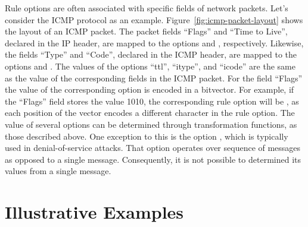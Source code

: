 \documentclass[sigconf,review, anonymous]{acmart}
\begin{document}
Rule options are often associated with specific fields of network
packets. Let's consider the ICMP protocol as an
example. Figure~\ref{fig:icmp-packet-layout} shows the layout of an
ICMP packet. The packet fields ``Flags'' and ``Time to Live'',
declared in the IP header, are mapped to the options 
and , respectively. Likewise, the fields ``Type'' and
``Code'', declared in the ICMP header, are mapped to the options
 and . The values of the options ``ttl'',
``itype'', and ``icode'' are the same as the value of the
corresponding fields in the ICMP packet. For the field ``Flags'' the
value of the corresponding option is encoded in a bitvector. For
example, if the ``Flags'' field stores the value 1010, the
corresponding rule option will be , as each
position of the vector encodes a different character in the
 rule option. The value of several options can be
determined through transformation functions, as those described
above. One exception to this is the option , which
is typically used in denial-of-service attacks. That option operates
over sequence of messages as opposed to a single
message. Consequently, it is not possible to determined its values
from a single message.





\section{Illustrative Examples}
\label{sec:suri-metas-coverage}
\end{document}
